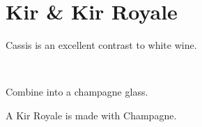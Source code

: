 \section[Kir]{
    Kir \& Kir Royale
}

\begin{recipestats}[
        servings=1,
        preptime=5~\minute,
        original=\citeauthor{kirIBA}~\cite{kirIBA},
    ]
\end{recipestats}

\begin{recipeabstract}
    Cassis is an excellent contrast to white wine.
\end{recipeabstract}

\begin{ingredientcolumns}[1]
    \begin{ingredientblock}
        \\
    \end{ingredientblock}
\end{ingredientcolumns}

\begin{preparation}
\item Combine into a champagne glass.
\end{preparation}

\begin{variation}
\item A Kir Royale is made with Champagne.
\end{variation}

\recipeend%
